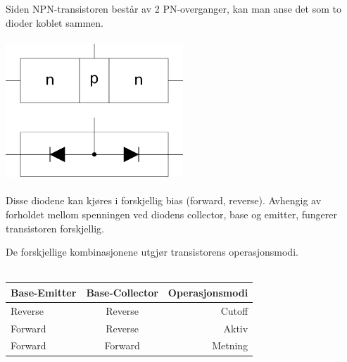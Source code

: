Siden NPN-transistoren består av 2 PN-overganger,
kan man anse det som to dioder koblet sammen.
\\\\
\includegraphics[width=0.5\textwidth]{./img/npn-bias}
\\\\
Disse diodene kan kjøres i forskjellig bias (forward, reverse).
Avhengig av forholdet mellom spenningen
ved diodens collector, base og emitter, fungerer transistoren forskjellig.

De forskjellige kombinasjonene utgjør transistorens operasjonsmodi.
\\\\
\begin{tabular}{ l | c | r}
Base-Emitter & Base-Collector & Operasjonsmodi \\ \hline
Reverse & Reverse & Cutoff \\
Forward & Reverse & Aktiv \\
Forward & Forward & Metning \\
\end{tabular}
